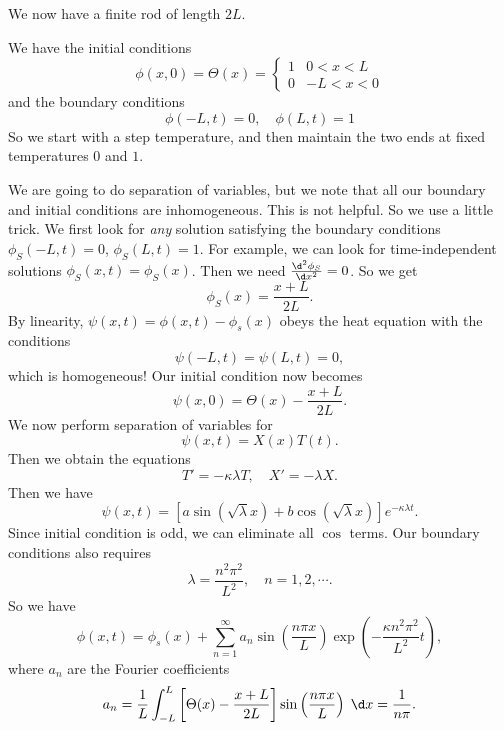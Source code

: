 \documentclass[a4paper]{article}
\begin{document}
\begin{eg}
  We now have a finite rod of length $2L$.
  \begin{center}
  \end{center}
  We have the initial conditions
  \[
    \phi(x, 0) = \Theta(x) =
    \begin{cases}
      1 & 0 < x < L\\
      0 & -L < x < 0
    \end{cases}
  \]
  and the boundary conditions
  \[
    \phi(-L, t) = 0,\quad \phi(L, t) = 1
  \]
  So we start with a step temperature, and then maintain the two ends at fixed temperatures $0$ and $1$.

  We are going to do separation of variables, but we note that all our boundary and initial conditions are inhomogeneous. This is not helpful. So we use a little trick. We first look for \emph{any} solution satisfying the boundary conditions $\phi_S(-L, t) = 0$, $\phi_S(L, t) = 1$. For example, we can look for time-independent solutions $\phi_S(x, t) = \phi_S(x)$. Then we need $\frac{\d^2 \phi_S}{\d x^2} = 0$. So we get
  \[
    \phi_S(x) = \frac{x + L}{2L}.
  \]
  By linearity, $\psi(x, t) = \phi(x, t) - \phi_s(x)$ obeys the heat equation with the conditions
  \[
    \psi(-L, t) = \psi(L, t) = 0,
  \]
  which is homogeneous! Our initial condition now becomes
  \[
    \psi(x, 0) = \Theta(x) - \frac{x + L}{2L}.
  \]
  We now perform separation of variables for
  \[
    \psi(x, t) = X(x) T(t).
  \]
  Then we obtain the equations
  \[
    T' = -\kappa \lambda T,\quad X' = - \lambda X.
  \]
  Then we have
  \[
    \psi(x, t) = \left[a\sin (\sqrt{\lambda} x) + b\cos (\sqrt{\lambda}x)\right] e^{-\kappa \lambda t}.
  \]
  Since initial condition is odd, we can eliminate all $\cos$ terms. Our boundary conditions also requires
  \[
    \lambda = \frac{n^2 \pi^2}{L^2}, \quad n = 1, 2, \cdots.
  \]
  So we have
  \[
    \phi(x, t) = \phi_s(x) + \sum_{n = 1}^\infty a_n \sin\left(\frac{n\pi x}{L}\right) \exp\left(-\frac{\kappa n^2 \pi^2}{L^2}t\right),
  \]
  where $a_n$ are the Fourier coefficients
  \[
    a_n = \frac{1}{L}\int_{-L}^L \left[\Theta(x) - \frac{x + L}{2L}\right] \sin\left(\frac{n\pi x}{L}\right)\;\d x = \frac{1}{n\pi}.
  \]
\end{eg}
\end{document}
